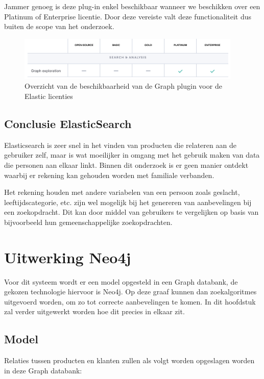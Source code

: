 Jammer genoeg is deze plug-in enkel beschikbaar wanneer we beschikken over een Platinum of Enterprise licentie. Door deze vereiste valt deze functionaliteit dus buiten de scope van het onderzoek. 

\begin{figure} [ht]
	\centering
	\includegraphics[width=0.95\textwidth]{img/elastic-license}
	\caption{Overzicht van de beschikbaarheid van de Graph plugin voor de Elastic licenties}
	\label{fig:elastic licenties overzicht graph}
\end{figure}


\subsection{Conclusie ElasticSearch}
\label{sec:Conclusie Elasticsearch}

Elasticsearch is zeer snel in het vinden van producten die relateren aan de gebruiker zelf, maar is wat moeilijker in omgang met het gebruik maken van data die personen aan elkaar linkt. Binnen dit onderzoek is er geen manier ontdekt waarbij er rekening kan gehouden worden met familiale verbanden. 

Het rekening houden met andere variabelen van een persoon zoals geslacht, leeftijdscategorie, etc. zijn wel mogelijk bij het genereren van aanbevelingen bij een zoekopdracht. Dit kan door middel van gebruikers te vergelijken op basis van bijvoorbeeld hun gemeenschappelijke zoekopdrachten.

\section{Uitwerking Neo4j}
\label{sec:UItwerking Neo4j}

Voor dit systeem wordt er een model opgesteld in een Graph databank, de gekozen technologie hiervoor is Neo4j. Op deze graaf kunnen dan zoekalgoritmes uitgevoerd worden, om zo tot correcte aanbevelingen te komen. In dit hoofdstuk zal verder uitgewerkt worden hoe dit precies in elkaar zit.

\subsection{Model}
\label{sec:Model}
Relaties tussen producten en klanten zullen als volgt worden opgeslagen worden in deze Graph databank:

